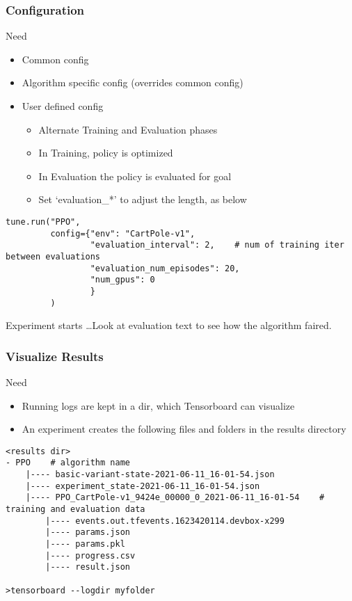 \begin{frame}[fragile]\frametitle{Configuration}
Need 
\begin{itemize}
\item Common config
\item Algorithm specific config (overrides common config)
\item User defined config
	\begin{itemize}
	\item Alternate Training and Evaluation phases
	\item In Training, policy is optimized
	\item In Evaluation the policy is evaluated for goal
	\item Set `evaluation\_*' to adjust the length, as below
	\end{itemize}
\end{itemize}


\begin{lstlisting}
tune.run("PPO",
         config={"env": "CartPole-v1",
                 "evaluation_interval": 2,    # num of training iter between evaluations
                 "evaluation_num_episodes": 20,
                 "num_gpus": 0
                 }
         )
\end{lstlisting}

Experiment starts \ldots Look at evaluation text to see how the algorithm faired.

\end{frame}

\begin{frame}[fragile]\frametitle{Visualize Results}
Need 
\begin{itemize}
\item Running logs are kept in a dir, which Tensorboard can visualize
\item An experiment creates the following files and folders in the results directory
\end{itemize}

\begin{lstlisting}
<results dir>
- PPO    # algorithm name
    |---- basic-variant-state-2021-06-11_16-01-54.json
    |---- experiment_state-2021-06-11_16-01-54.json
    |---- PPO_CartPole-v1_9424e_00000_0_2021-06-11_16-01-54    # training and evaluation data
        |---- events.out.tfevents.1623420114.devbox-x299
        |---- params.json
        |---- params.pkl
        |---- progress.csv
        |---- result.json
				
>tensorboard --logdir myfolder						
\end{lstlisting}


\end{frame}


